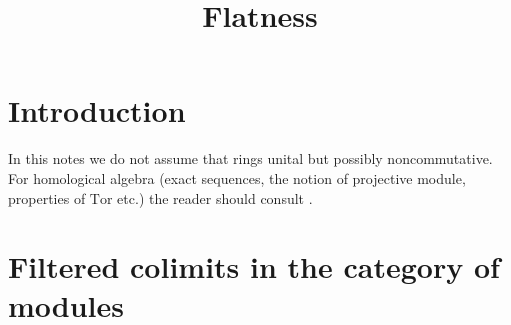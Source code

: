



\title{Flatness}
\date{}
\maketitle
\section{Introduction}
\noindent
In this notes we do not assume that rings unital but possibly noncommutative. For homological algebra (exact sequences, the notion of projective module, properties of $\mathrm{Tor}$ etc.) the reader should consult \cite{weibel1995introduction}.

\section{Filtered colimits in the category of modules}

